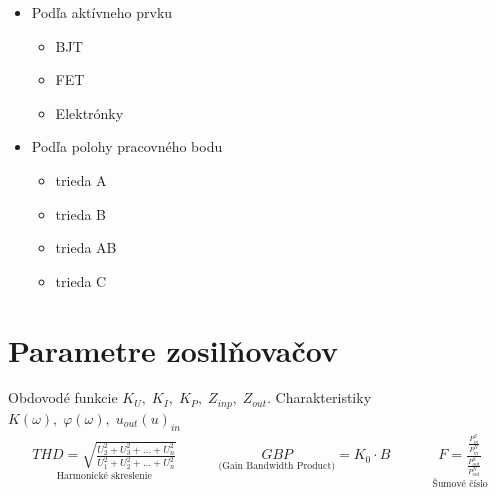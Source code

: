 \begin{itemize}
\begin{itemize}
		\item úzkopásmové - ladené vf
		\item širokopásmové - nf a vf
	\end{itemize}
	\item Podľa aktívneho prvku
	\begin{itemize}
		\item BJT
		\item FET
		\item Elektrónky
	\end{itemize}
	\item Podľa polohy pracovného bodu
	\begin{itemize}
		\item trieda A
		\item trieda B
		\item trieda AB
		\item trieda C
	\end{itemize}
\end{itemize}
\section{Parametre zosilňovačov}
Obdovodé funkcie \(K_U, \; K_I, \; K_P, \; Z_{inp}, \; Z_{out}\). \newline
Charakteristiky \(K(\omega), \; \varphi(\omega), \; u_{out}(u)_{in}\)
\begin{align}
	\underset{\text{Harmonické skreslenie}}{THD = \sqrt{\frac{U_2^2 + U_3^2 + \dots + U_n^2}{U_1^2 + U_2^2 + \dots + U_n^2}}}
	\qquad \quad 
	\underset{\text{(Gain Bandwidth Product)}}{GBP} = K_0 \cdot B 
	\qquad \quad 
	\underset{\text{Šumové číslo}}{F = \frac{\frac{P_{in}^{S}}{P_{in}^{N}}}{\frac{P_{out}^{S}}{P_{out}^{N}}}}
\end{align}
